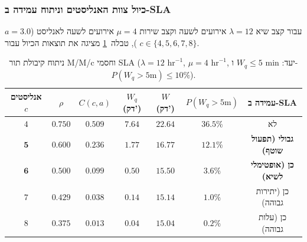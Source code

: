 \subsubsection{כיול צוות האנליסטים וניתוח עמידה ב-\textenglish{SLA}}
עבור קצב שיא $\lambda = 12$ אירועים לשעה וקצב שירות $\mu = 4$ אירועים לשעה לאנליסט ($a = 3.0$), טבלה~\ref{tab:mmc-sizing} מציגה את תוצאות הכיול עבור $c \in \{4,5,6,7,8\}$.

\begin{table}[htbp]
\centering
\caption{ניתוח קיבולת תור \textenglish{M/M/c} וחסמי \textenglish{SLA} ($\lambda = 12\text{ hr}^{-1}$, $\mu = 4\text{ hr}^{-1}$, יעד: $W_q \le 5\text{ min}$ ו-$P(W_q > 5\text{m}) \le 10\%$).}
\label{tab:mmc-sizing}
\begin{tabular}{@{}ccccccc@{}}
\toprule
\textbf{אנליסטים $c$} & $\rho$ & $C(c,a)$ & $W_q$ (דק') & $W$ (דק') & $P(W_q > 5\text{m})$ & \textbf{עמידה ב-\textenglish{SLA}} \\
\midrule
$4$ & $0.750$ & $0.509$ & $7.64$ & $22.64$ & $36.5\%$ & לא \\
$\mathbf{5}$ & $\mathbf{0.600}$ & $\mathbf{0.236}$ & $\mathbf{1.77}$ & $\mathbf{16.77}$ & $\mathbf{12.1\%}$ & \textbf{גבולי (תפעול שוטף)} \\
$\mathbf{6}$ & $\mathbf{0.500}$ & $\mathbf{0.099}$ & $\mathbf{0.50}$ & $\mathbf{15.50}$ & $\mathbf{3.6\%}$ & \textbf{כן (אופטימלי לשיא)} \\
$7$ & $0.429$ & $0.038$ & $0.14$ & $15.14$ & $1.0\%$ & כן (יתירות גבוהה) \\
$8$ & $0.375$ & $0.013$ & $0.04$ & $15.04$ & $0.2\%$ & כן (עלות גבוהה) \\
\bottomrule
\end{tabular}
\end{table}

